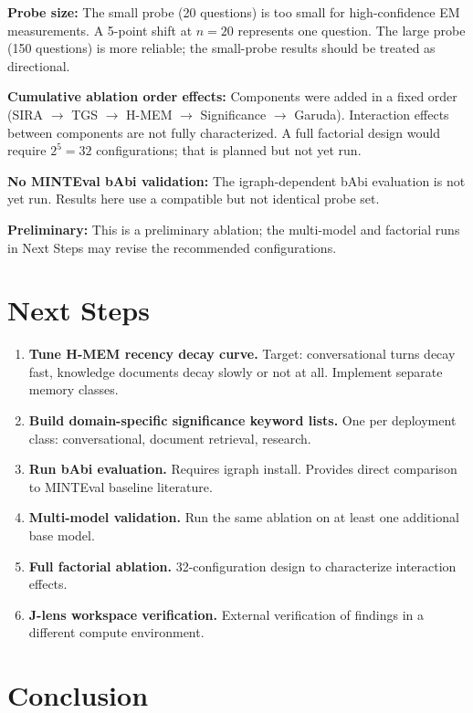 \documentclass[11pt,a4paper]{article}
\begin{document}
\textbf{Probe size:} The small probe (20 questions) is too small for high-confidence EM measurements. A 5-point shift at $n=20$ represents one question. The large probe (150 questions) is more reliable; the small-probe results should be treated as directional.

\textbf{Cumulative ablation order effects:} Components were added in a fixed order (SIRA $\rightarrow$ TGS $\rightarrow$ H-MEM $\rightarrow$ Significance $\rightarrow$ Garuda). Interaction effects between components are not fully characterized. A full factorial design would require $2^5 = 32$ configurations; that is planned but not yet run.

\textbf{No MINTEval bAbi validation:} The igraph-dependent bAbi evaluation is not yet run. Results here use a compatible but not identical probe set.

\textbf{Preliminary:} This is a preliminary ablation; the multi-model and factorial runs in Next Steps may revise the recommended configurations.

\section{Next Steps}

\begin{enumerate}
  \item \textbf{Tune H-MEM recency decay curve.} Target: conversational turns decay fast, knowledge documents decay slowly or not at all. Implement separate memory classes.
  \item \textbf{Build domain-specific significance keyword lists.} One per deployment class: conversational, document retrieval, research.
  \item \textbf{Run bAbi evaluation.} Requires igraph install. Provides direct comparison to MINTEval baseline literature.
  \item \textbf{Multi-model validation.} Run the same ablation on at least one additional base model.
  \item \textbf{Full factorial ablation.} 32-configuration design to characterize interaction effects.
  \item \textbf{J-lens workspace verification.} External verification of findings in a different compute environment.
\end{enumerate}

\section{Conclusion}
\end{document}
